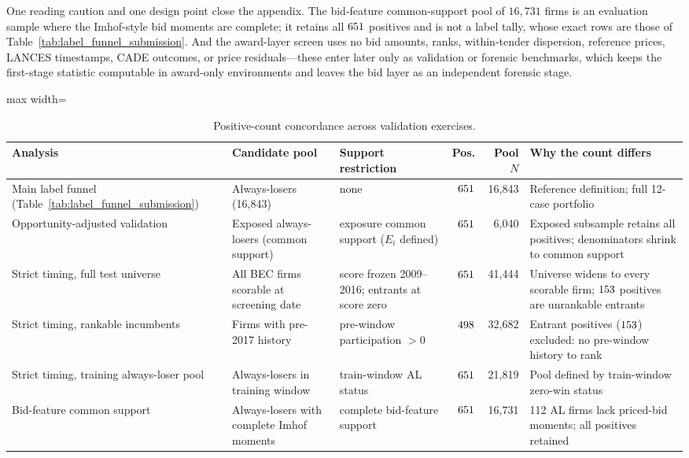 One reading caution and one design point close the appendix. The
bid-feature common-support pool of $16{,}731$ firms is an evaluation
sample where the Imhof-style bid moments are complete; it retains all
$651$ positives and is not a label tally, whose exact
rows are those of Table~\ref{tab:label_funnel_submission}. And the
award-layer screen uses no bid amounts, ranks, within-tender
dispersion, reference prices, LANCES timestamps, CADE outcomes, or
price residuals---these enter later only as validation or forensic
benchmarks, which keeps the first-stage statistic computable in
award-only environments and leaves the bid layer as an independent
forensic stage.

\begin{table}[!htbp]\centering
\caption{Positive-count concordance across validation exercises.}
\label{tab:positive_count_concordance}
\begin{threeparttable}
\begin{adjustbox}{max width=\textwidth}
\scriptsize
\begin{tabular}{p{3.4cm}p{3.2cm}p{2.8cm}rrp{4.2cm}}
\toprule
Analysis & Candidate pool & Support restriction & Pos. & Pool $N$ & Why the count differs \\
\midrule
Main label funnel (Table~\ref{tab:label_funnel_submission}) & Always-losers (16,843) & none & $651$ & 16,843 & Reference definition; full 12-case portfolio \\
Opportunity-adjusted validation & Exposed always-losers (common support) & exposure common support ($E_i$ defined) & $651$ & 6,040 & Exposed subsample retains all positives; denominators shrink to common support \\
Strict timing, full test universe & All BEC firms scorable at screening date & score frozen 2009--2016; entrants at score zero & $651$ & 41,444 & Universe widens to every scorable firm; $153$ positives are unrankable entrants \\
Strict timing, rankable incumbents & Firms with pre-2017 history & pre-window participation $>0$ & $498$ & 32,682 & Entrant positives ($153$) excluded: no pre-window history to rank \\
Strict timing, training always-loser pool & Always-losers in training window & train-window AL status & $651$ & 21,819 & Pool defined by train-window zero-win status \\
Bid-feature common support & Always-losers with complete Imhof moments & complete bid-feature support & $651$ & 16,731 & 112 AL firms lack priced-bid moments; all positives retained \\

\end{tabular}
\end{adjustbox}
\end{threeparttable}
\end{table}
